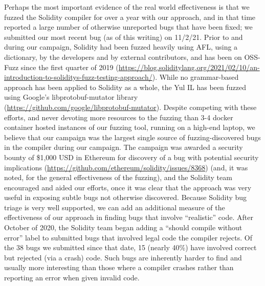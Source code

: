 \begin{sloppypar}
  Perhaps the most important evidence of the real world effectiveness is that we fuzzed the Solidity compiler for over a year with our approach, and in that time reported a large number of otherwise unreported bugs that have been fixed; we submitted our most recent bug (as of this writing) on 11/2/21.  Prior to and during our campaign, Solidity had been fuzzed heavily using AFL, using a dictionary, by the developers and by external contributors, and has been on OSS-Fuzz since the first quarter of 2019 (\url{https://blog.soliditylang.org/2021/02/10/an-introduction-to-soliditys-fuzz-testing-approach/}).  While no grammar-based approach has been applied to Solidity as a whole, the Yul IL has been fuzzed using Google's libprotobuf-mutator library (\url{https://github.com/google/libprotobuf-mutator}).  Despite competing with these efforts, and never devoting more resources to the fuzzing than 3-4 docker container hosted instances of our fuzzing tool, running on a high-end laptop, we believe that our campaign was the largest single source of fuzzing-discovered bugs in the compiler during our campaign.  The campaign was awarded a security bounty of \$1,000 USD in Ethereum for discovery of a bug with potential security implications (\url{https://github.com/ethereum/solidity/issues/8368}) (and, it was noted, for the general effectiveness of the fuzzing), and the Solidity team encouraged and aided our efforts, once it was clear that the approach was very useful in exposing subtle bugs not otherwise discovered.  Because Solidity bug triage is very well supported, we can add an additional measure of the effectiveness of our approach in finding bugs that involve ``realistic'' code.  After October of 2020, the Solidity team began adding a ``should compile without error'' label to submitted bugs that involved legal code the compiler rejects.  Of the 38 bugs we submitted since that date, 15 (nearly 40\%) have involved correct but rejected (via a crash) code.  Such bugs are inherently harder to find and usually more interesting than those where a compiler crashes rather than reporting an error when given invalid code.
\end{sloppypar}

